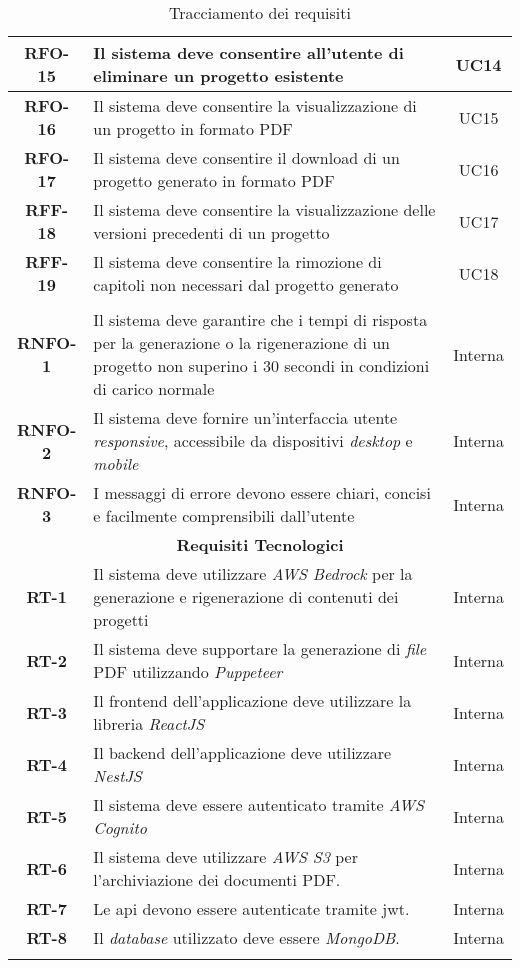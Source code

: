\begin{longtable}{|c|>{\centering\arraybackslash}p{}|c|}
    \hline
    \textbf{RFO-15} & Il sistema deve consentire all'utente di eliminare un progetto esistente & UC14 \\
    \hline
    \textbf{RFO-16} & Il sistema deve consentire la visualizzazione di un progetto in formato PDF & UC15 \\
    \hline
    \textbf{RFO-17} & Il sistema deve consentire il download di un progetto generato in formato PDF & UC16 \\
    \hline
    \textbf{RFF-18} & Il sistema deve consentire la visualizzazione delle versioni precedenti di un progetto & UC17 \\
    \hline
    \textbf{RFF-19} & Il sistema deve consentire la rimozione di capitoli non necessari dal progetto generato & UC18 \\
    \hline
    \pagebreak
    \hline
    \multicolumn{3}{|c|}{\rowcolor{green!30} \textbf{Requisiti Non Funzionali}} \\
    \hline %
    \textbf{RNFO-1} & Il sistema deve garantire che i tempi di risposta per la generazione o la rigenerazione di un progetto non superino i 30 secondi in condizioni di carico normale & Interna \\
    \hline
    \textbf{RNFO-2} & Il sistema deve fornire un’interfaccia utente \textit{responsive}, accessibile da dispositivi \textit{desktop} e \textit{mobile} & Interna \\
    \hline
    \textbf{RNFO-3} & I messaggi di errore devono essere chiari, concisi e facilmente comprensibili dall'utente & Interna \\
    \hline
    \multicolumn{3}{|c|}{\rowcolor{green!30} \textbf{Requisiti Tecnologici}} \\
    \hline
    \textbf{RT-1} & Il sistema deve utilizzare \textit{AWS Bedrock} per la generazione e rigenerazione di contenuti dei progetti & Interna \\
    \hline
    \textbf{RT-2} & Il sistema deve supportare la generazione di \textit{file} PDF utilizzando \textit{Puppeteer} & Interna \\
    \hline
    \textbf{RT-3} & Il frontend dell’applicazione deve utilizzare la libreria \textit{ReactJS} & Interna \\
    \hline
    \textbf{RT-4} & Il backend dell’applicazione deve utilizzare \textit{NestJS} & Interna \\
    \hline
    \textbf{RT-5} & Il sistema deve essere autenticato tramite \textit{AWS Cognito} & Interna \\
    \hline
    \textbf{RT-6} & Il sistema deve utilizzare \textit{AWS S3} per l’archiviazione dei documenti PDF. & Interna \\
    \hline
    \textbf{RT-7} & Le \gls{api} devono essere autenticate tramite \gls{jwt}. & Interna \\
    \hline
    \textbf{RT-8} & Il \textit{database} utilizzato deve essere \textit{MongoDB}. & Interna \\
    
    \hline
    \caption{Tracciamento dei requisiti} %
    \label{tab:requisiti-stage} %
\end{longtable}